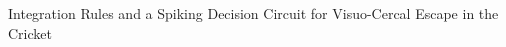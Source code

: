 \documentclass{discussion}
\begin{document}

\begin{theme}
Integration Rules and a Spiking Decision Circuit for Visuo-Cercal Escape in the Cricket
\end{theme}

\begin{progress}

\end{progress}

\begin{problems}


\end{problems}

\begin{purchase}

\end{purchase}


\begin{plan}


\end{plan}


\begin{materials}

\end{materials}

\discfooter{}
\end{document}
